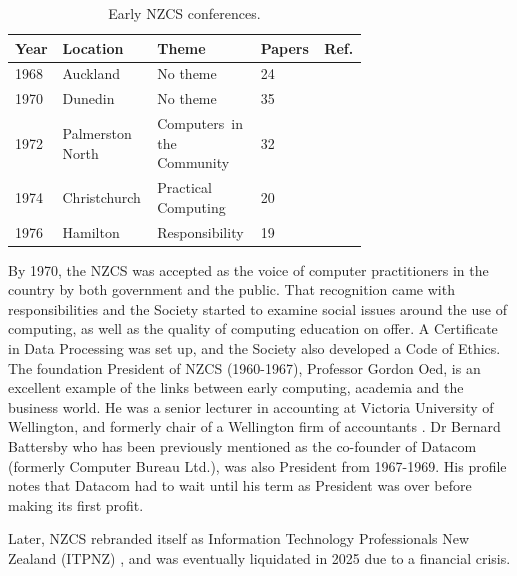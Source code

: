 \documentclass{IEEEcsmag}
\begin{document}
\begin{table}[h]
\begin{center}
\begin{tabular}{|p{0.07\linewidth}|p{0.20\linewidth}|p{0.26\linewidth}|p{0.12\linewidth}|p{0.05\linewidth}<{\raggedright\arraybackslash}|} 
 \hline
 Year & Location & Theme  & Papers & Ref.\\ 
\hline
1968 & Auckland & No theme & 24 & \cite{NZCS-1}\\\hline
1970 & Dunedin& No theme &  35 & \cite{NZCS-2}\\\hline
1972 & Palmerston North & Computers~in the Community &  32 & \cite{NZCS-3}\\\hline
1974 & Christchurch & Practical Computing &  20 & \cite{NZCS-4}\\\hline
1976 & Hamilton & Responsibility &  19 & \cite{NZCS-5}\\\hline
\end{tabular}
\vspace{1ex}
\caption{\label{NZCSconf}Early NZCS conferences.}
\end{center}
\end{table}

By 1970, the NZCS was accepted as the voice of computer practitioners in the country by both government and the public.  That recognition came with responsibilities and the Society started to examine social issues around the use of computing, as well as the quality of computing education on offer.  A Certificate in Data Processing was set up, and the Society also developed a Code of Ethics.
The foundation President of NZCS (1960-1967), Professor Gordon Oed,  is an excellent example of the links between early computing, academia and the business world. He was a senior lecturer in accounting at Victoria University of Wellington, and formerly chair of a Wellington firm of accountants \cite{Toland-2022}. Dr Bernard Battersby who has been previously mentioned as the co-founder of Datacom (formerly Computer Bureau Ltd.), was also President from 1967-1969. His profile notes that Datacom had to wait until his term as President was over before making its first profit.

Later, NZCS rebranded itself as Information Technology Professionals New Zealand (ITPNZ) \cite{Matthews}, and was eventually liquidated in 2025 due to a financial crisis.
\end{document}
